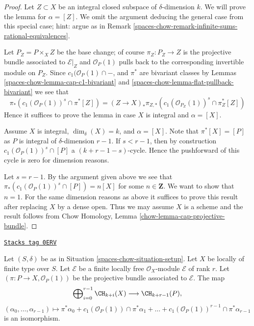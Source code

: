 \begin{proof}
Let $Z \subset X$ be an integral closed subspace of $\delta$-dimension $k$.
We will prove the lemma for $\alpha = [Z]$. We omit the argument
deducing the general case from this special case; hint: argue as in
Remark \ref{spaces-chow-remark-infinite-sums-rational-equivalences}.

\medskip\noindent
Let $P_Z = P \times_X Z$ be the base change; of course
$\pi_Z : P_Z \to Z$ is the projective bundle associated to $\mathcal{E}|_Z$
and $\mathcal{O}_P(1)$ pulls back to the corresponding
invertible module on $P_Z$. Since $c_1(\mathcal{O}_P(1) \cap -$, and
$\pi^*$ are bivariant classes by Lemmas
\ref{spaces-chow-lemma-cap-c1-bivariant} and \ref{spaces-chow-lemma-flat-pullback-bivariant}
we see that
$$
\pi_*\left(
c_1(\mathcal{O}_P(1))^s \cap \pi^*[Z]
\right)
=
(Z \to X)_*\pi_{Z, *}\left(
c_1(\mathcal{O}_{P_Z}(1))^s \cap \pi_Z^*[Z]
\right)
$$
Hence it suffices to prove the lemma in case $X$ is integral
and $\alpha  = [X]$.

\medskip\noindent
Assume $X$ is integral, $\dim_\delta(X) = k$, and $\alpha = [X]$.
Note that $\pi^*[X] = [P]$ as $P$ is integral of
$\delta$-dimension $r - 1$. If $s < r - 1$, then by construction
$c_1(\mathcal{O}_P(1))^s \cap [P]$ a $(k + r - 1 - s)$-cycle.
Hence the pushforward of this cycle is zero for dimension reasons.

\medskip\noindent
Let $s = r - 1$. By the argument given above we see that
$\pi_*(c_1(\mathcal{O}_P(1))^s \cap [P]) = n [X]$
for some $n \in \mathbf{Z}$. We want to show that $n = 1$.
For the same dimension reasons as above it suffices to prove this
result after replacing $X$ by a dense open.
Thus we may assume $X$ is a scheme and the result follows
from Chow Homology, Lemma \ref{chow-lemma-cap-projective-bundle}.
\end{proof}

\begin{lemma}

\label{spaces-chow-lemma-chow-ring-projective-bundle}
\href{https://stacks.math.columbia.edu/tag/0ERV}{\texttt{Stacks tag 0ERV}}

Let $(S, \delta)$ be as in Situation \ref{spaces-chow-situation-setup}.
Let $X$ be locally of finite type over $S$.
Let $\mathcal{E}$ be a finite locally free $\mathcal{O}_X$-module
$\mathcal{E}$ of rank $r$. Let $(\pi : P \to X, \mathcal{O}_P(1))$
be the projective bundle associated to $\mathcal{E}$.
The map
$$
\bigoplus\nolimits_{i = 0}^{r - 1}
\CH_{k + i}(X)
\longrightarrow
\CH_{k + r - 1}(P),
$$
$$
(\alpha_0, \ldots, \alpha_{r-1})
\longmapsto
\pi^*\alpha_0 +
c_1(\mathcal{O}_P(1)) \cap \pi^*\alpha_1
+ \ldots +
c_1(\mathcal{O}_P(1))^{r - 1} \cap \pi^*\alpha_{r-1}
$$
is an isomorphism.
\end{lemma}

